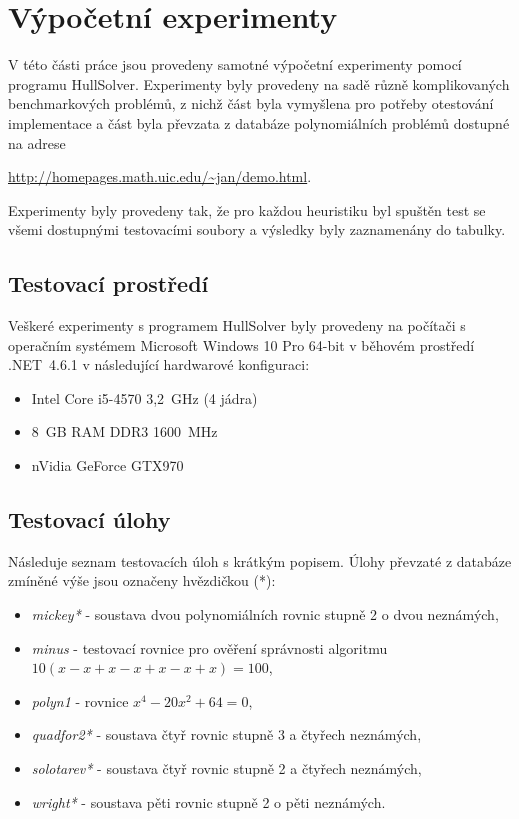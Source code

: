 

\chapter{Výpočetní experimenty}
V této části práce jsou provedeny samotné výpočetní experimenty pomocí programu HullSolver. Experimenty byly provedeny na sadě různě komplikovaných benchmarkových problémů, z nichž část byla vymyšlena pro potřeby otestování implementace a část byla převzata z databáze polynomiálních problémů dostupné na adrese {\url{http://homepages.math.uic.edu/~jan/demo.html}.

Experimenty byly provedeny tak, že pro každou heuristiku byl spuštěn test se všemi dostupnými testovacími soubory a výsledky byly zaznamenány do tabulky.


\section{Testovací prostředí}
Veškeré experimenty s programem HullSolver byly provedeny na počítači s operačním systémem Microsoft Windows 10 Pro 64-bit v běhovém prostředí .NET~4.6.1 v následující hardwarové konfiguraci:

\begin{itemize}
\item Intel Core i5-4570 3,2~GHz (4 jádra)
\item 8~GB RAM DDR3 1600~MHz
\item nVidia GeForce GTX970
\end{itemize}

\section{Testovací úlohy}

Následuje seznam testovacích úloh s krátkým popisem. Úlohy převzaté z databáze zmíněné výše jsou označeny hvězdičkou (*):

\begin{itemize}
    \item \emph{mickey*} - soustava dvou polynomiálních rovnic stupně 2 o dvou neznámých,
    \item \emph{minus} - testovací rovnice pro ověření správnosti algoritmu $10(x - x + x - x + x - x + x) = 100$,
    \item \emph{polyn1} - rovnice $x^4 - 20x^2 + 64 = 0$,
    \item \emph{quadfor2*} - soustava čtyř rovnic stupně 3 a čtyřech neznámých,
    \item \emph{solotarev*} - soustava čtyř rovnic stupně 2 a čtyřech neznámých,
    \item \emph{wright*} - soustava pěti rovnic stupně 2 o pěti neznámých.
\end{itemize}

}
